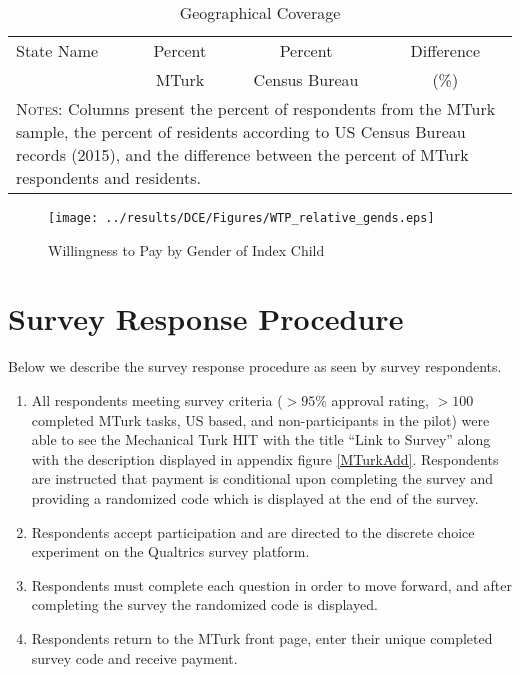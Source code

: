\documentclass[a4paper, 11pt]{article}
\begin{document}
\begingroup
\setlength{\LTleft}{-20cm plus -1fill}
\setlength{\LTright}{\LTleft}
\begin{longtable}{lccc} 
  \caption{Geographical Coverage} \label{tab:cover} \\
  \hline
  State Name & Percent & Percent & Difference \\
             & MTurk      & Census Bureau & (\%)          \\ \hline \endhead
  
  \hline 
  \multicolumn{4}{p{10.4cm}}{{\footnotesize\textsc{Notes:} Columns present the percent of respondents from the MTurk sample, the percent of residents according to US Census Bureau records (2015), and the difference between the percent of MTurk respondents and residents.}}
\end{longtable}
\endgroup

\begin{landscape}
\begin{figure}[htpb!]
  \begin{center}
    \caption{Willingness to Pay by Gender of Index Child}
    \label{graphGend}
  \texttt{[image: ../results/DCE/Figures/WTP\_relative\_gends.eps]}
  \end{center}
\end{figure}
\end{landscape}




\section{Survey Response Procedure}
\label{app:procedure}
Below we describe the survey response procedure as seen by survey respondents.
\begin{enumerate}
\item All respondents meeting survey criteria ($>95\%$ approval rating, $>100$ completed MTurk tasks, US based, and non-participants in the pilot) were able to see the Mechanical Turk HIT with the title ``Link to Survey'' along with the description displayed in appendix figure \ref{MTurkAdd}. Respondents are instructed that payment is conditional upon completing the survey and providing a randomized code which is displayed at the end of the survey.
\item Respondents accept participation and are directed to the discrete choice experiment on the Qualtrics survey platform.
\item Respondents must complete each question in order to move forward, and after completing the survey the randomized code is displayed.
\item Respondents return to the MTurk front page, enter their unique completed survey code and receive payment.
\end{enumerate}
\end{document}
